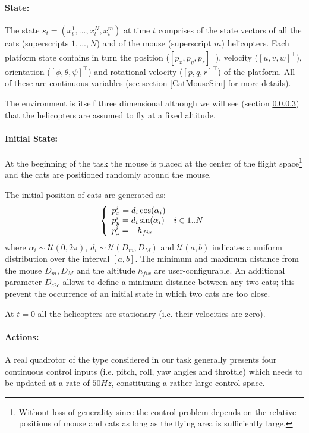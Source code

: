 \documentclass[a4paper,11pt]{report}
\begin{document}
\paragraph{State:} The state $s_t = (x^1_t,...,x^{N}_t,x^m_t)$ at time $t$ comprises of the state vectors of all the cats (superscripts $1,...,N$) and of the mouse (superscript $m$) helicopters. 
Each platform state contains in turn the position ($[p_x,p_y,p_z]^\intercal$), velocity ($[u,v,w]^\intercal$), orientation ($[\phi,\theta,\psi]^\intercal$) and rotational velocity ($[p,q,r]^\intercal$) of the platform. All of these are continuous variables (see section \ref{CatMouseSim} for more details).

The environment is itself three dimensional although we will see (section \ref{catmouseactions}) that the helicopters are assumed to fly at a fixed altitude.

\paragraph{Initial State:} At the beginning of the task the mouse is placed at the center of the flight space\footnote{Without loss of generality since the control problem depends on the relative positions of mouse and cats as long as the flying area is sufficiently large.} and the cats are positioned randomly around the mouse.

The initial position of cats are generated as:
$$
\left\{
\begin{array}{l l}
p^i_x =  d_i \cos(\alpha_i) & \\
p^i_y =  d_i \sin(\alpha_i) & i \in 1..N\\
p^i_z = - h_{fix} & \\
\end{array}
\right.
$$
where $\alpha_i \sim \mathcal{U}(0,2\pi)$, $d_i \sim \mathcal{U}(D_m,D_M)$ and $\mathcal{U}(a,b)$ indicates a uniform distribution over the interval $[a,b]$. The minimum and maximum distance from the mouse $D_m,D_M$ and the altitude $h_{fix}$ are user-configurable.
An additional parameter $D_{c2c}$ allows to define a minimum distance between any two cats; this prevent the occurrence of an initial state in which two cats are too close.

At $t=0$ all the helicopters are stationary (i.e. their velocities are zero).

\paragraph{Actions:}\label{catmouseactions} 
A real quadrotor of the type considered in our task generally presents four continuous control inputs (i.e. pitch, roll, yaw angles and throttle) which needs to be updated at a rate of $50Hz$, constituting a rather large control space.
\end{document}
